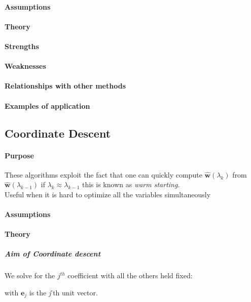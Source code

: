 \paragraph{Assumptions}
\paragraph{Theory}
\paragraph{Strengths}
\paragraph{Weaknesses}
\paragraph{Relationships with other methods}
\paragraph{Examples of application}

\subsection{Coordinate Descent}
\paragraph{Purpose}
These algorithms exploit the fact that one can quickly compute $\hat{\bm{w}}(
\lambda_{k})$ from $\hat{\bm{w}}(\lambda_{k-1})$ if $\lambda_{k} \approx \lambda_{k-1}$
this is known as \emph{warm starting}.\\
Useful when it is hard to optimize all the variables simultaneously 
\paragraph{Assumptions}
\paragraph{Theory}
\subparagraph{Aim of Coordinate descent}
We solve for the $j^{th}$ coefficient with all the others held fixed: 
\begin{center}
     with $\bm{e}_{j}$
    is the \emph{j}'th unit vector. 
\end{center}


